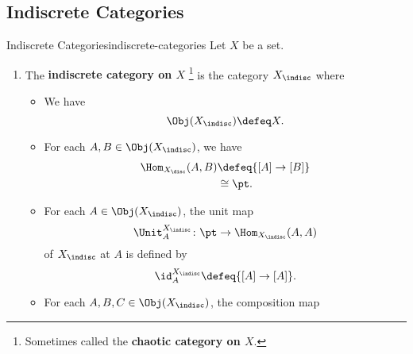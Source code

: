 \subsection{Indiscrete Categories}\label{subsection-the-quadruple-adjunction-with-sets-indiscrete-categories}
\begin{definition}{Indiscrete Categories}{indiscrete-categories}%
    Let $X$ be a set.
    \begin{enumerate}
        \item\label{indiscrete-categories-the-indiscrete-category-on-a-set}The \textbf{indiscrete category on $X$}%
            \footnote{%
                Sometimes called the \textbf{chaotic category on $X$}.
                \par\vspace*{-1.75\baselineskip}
            } %
            is the category $X_{\indisc}$ where
            \begin{itemize}
                \item{}We have
                    \[
                        \Obj(X_{\indisc})
                        \defeq
                        X.
                    \]%
                \item{}For each $A,B\in\Obj(X_{\indisc})$, we have
                    \begin{align*}
                        \Hom_{X_{\disc}}(A,B) &\defeq \{[A]\to[B]\}\\
                                              &\cong  \pt.
                    \end{align*}
                \item{}For each $A\in\Obj(X_{\indisc})$, the unit map
                    \[
                        \Unit^{X_{\indisc}}_{A}
                        \colon
                        \pt
                        \to
                        \Hom_{X_{\indisc}}(A,A)
                    \]%
                    of $X_{\indisc}$ at $A$ is defined by
                    \[
                        \id^{X_{\indisc}}_{A}
                        \defeq
                        \{[A]\to[A]\}.
                    \]%
                \item{}For each $A,B,C\in\Obj(X_{\indisc})$, the composition map
                    \[
\]
\end{itemize}
\end{enumerate}
\end{definition}
